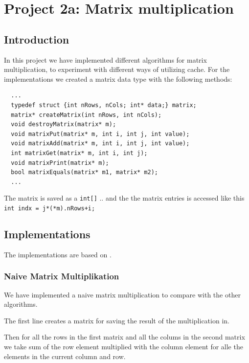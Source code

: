 
\chapter{Project 2a: Matrix multiplication} %

\label{Chapter2} %




\section{Introduction}
In this project we have implemented different algorithms for matrix multiplication, to experiment with different ways of utilizing cache.
For the implementations we created a matrix data type with the following methods:
\begin{lstlisting}
  ...
  typedef struct {int nRows, nCols; int* data;} matrix;
  matrix* createMatrix(int nRows, int nCols);
  void destroyMatrix(matrix* m);
  void matrixPut(matrix* m, int i, int j, int value);
  void matrixAdd(matrix* m, int i, int j, int value);
  int matrixGet(matrix* m, int i, int j);
  void matrixPrint(matrix* m);
  bool matrixEquals(matrix* m1, matrix* m2);
  ...
\end{lstlisting}
The matrix is saved as a \verb!int[]! ..  and the the matrix entries is accessed like this \verb!int indx = j*(*m).nRows+i;!

\section{Implementations}
The implementations are based on \citep{matrixMultiplication}.

\subsection{Naive Matrix Multiplikation}
We have implemented a naive matrix multiplication to compare with the other algorithms.

The first line creates a matrix for saving the result of the multiplication in.

Then for all the rows in the first matrix and all the colums in the second matrix we take sum of the row element multiplied with the column element for alle the elements in the current column and row.


